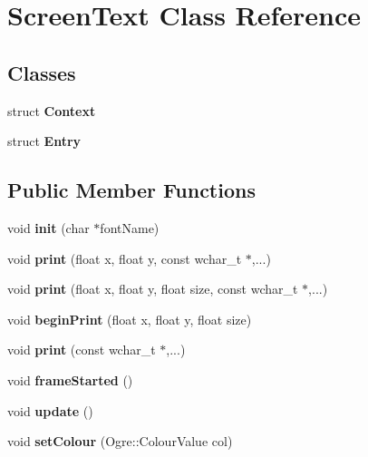 \hypertarget{class_screen_text}{
\section{ScreenText Class Reference}
\label{class_screen_text}
}
\subsection*{Classes}
\begin{DoxyCompactItemize}
\item 
struct {\bfseries Context}
\item 
struct {\bfseries Entry}
\end{DoxyCompactItemize}
\subsection*{Public Member Functions}
\begin{DoxyCompactItemize}
\item 
\hypertarget{class_screen_text_a6e09c2e5496cccec32f8b67053a798bf}{
void {\bfseries init} (char $\ast$fontName)}
\label{class_screen_text_a6e09c2e5496cccec32f8b67053a798bf}

\item 
\hypertarget{class_screen_text_a944d39f59e6ab98b8c67af2d968f207d}{
void {\bfseries print} (float x, float y, const wchar\_\-t $\ast$,...)}
\label{class_screen_text_a944d39f59e6ab98b8c67af2d968f207d}

\item 
\hypertarget{class_screen_text_a2b51773f0439d854a8ee9bb55262bfa3}{
void {\bfseries print} (float x, float y, float size, const wchar\_\-t $\ast$,...)}
\label{class_screen_text_a2b51773f0439d854a8ee9bb55262bfa3}

\item 
\hypertarget{class_screen_text_a253ddee6c7f9308af47edc45090375ff}{
void {\bfseries beginPrint} (float x, float y, float size)}
\label{class_screen_text_a253ddee6c7f9308af47edc45090375ff}

\item 
\hypertarget{class_screen_text_ad3409bacf2e94ea3789cab86d767533a}{
void {\bfseries print} (const wchar\_\-t $\ast$,...)}
\label{class_screen_text_ad3409bacf2e94ea3789cab86d767533a}

\item 
\hypertarget{class_screen_text_ad604ee96d571b2bfbe1c96a44011f707}{
void {\bfseries frameStarted} ()}
\label{class_screen_text_ad604ee96d571b2bfbe1c96a44011f707}

\item 
\hypertarget{class_screen_text_aac850f52cbbfd8be29eebe0fa7b7c651}{
void {\bfseries update} ()}
\label{class_screen_text_aac850f52cbbfd8be29eebe0fa7b7c651}

\item 
\hypertarget{class_screen_text_a0951405adc07a3ee8040e0f6c51c127a}{
void {\bfseries setColour} (Ogre::ColourValue col)}
\label{class_screen_text_a0951405adc07a3ee8040e0f6c51c127a}

\end{DoxyCompactItemize}


